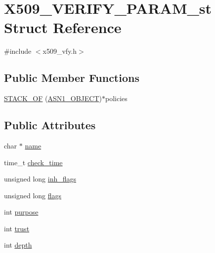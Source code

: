 \hypertarget{struct_x509___v_e_r_i_f_y___p_a_r_a_m__st}{}\section{X509\+\_\+\+V\+E\+R\+I\+F\+Y\+\_\+\+P\+A\+R\+A\+M\+\_\+st Struct Reference}
\label{struct_x509___v_e_r_i_f_y___p_a_r_a_m__st}


{\ttfamily \#include $<$x509\+\_\+vfy.\+h$>$}

\subsection*{Public Member Functions}
\begin{DoxyCompactItemize}
\item 
\hyperlink{struct_x509___v_e_r_i_f_y___p_a_r_a_m__st_a5087643f8379670666afff2ef319f0f2}{S\+T\+A\+C\+K\+\_\+\+OF} (\hyperlink{asn1_8h_ae10c08e4e6b23f67a39b2add932ec48f}{A\+S\+N1\+\_\+\+O\+B\+J\+E\+CT})$\ast$policies
\end{DoxyCompactItemize}
\subsection*{Public Attributes}
\begin{DoxyCompactItemize}
\item 
char $\ast$ \hyperlink{struct_x509___v_e_r_i_f_y___p_a_r_a_m__st_a60084caf30e3bddf4fe9264a76441411}{name}
\item 
time\+\_\+t \hyperlink{struct_x509___v_e_r_i_f_y___p_a_r_a_m__st_a2f5100a1ff11cf55b96ddaf802f434d0}{check\+\_\+time}
\item 
unsigned long \hyperlink{struct_x509___v_e_r_i_f_y___p_a_r_a_m__st_ae194a37f094a45b53ddd8156c5e2bab1}{inh\+\_\+flags}
\item 
unsigned long \hyperlink{struct_x509___v_e_r_i_f_y___p_a_r_a_m__st_a3ef03c3f57b0a90d4182a057fe0c8d27}{flags}
\item 
int \hyperlink{struct_x509___v_e_r_i_f_y___p_a_r_a_m__st_acae8fafa928701889f757951552f5ee9}{purpose}
\item 
int \hyperlink{struct_x509___v_e_r_i_f_y___p_a_r_a_m__st_a7b7d5b079ed79cb2399ad471d1b57415}{trust}
\item 
int \hyperlink{struct_x509___v_e_r_i_f_y___p_a_r_a_m__st_afb5fd48dac56bdbd2e1d9e8e69bfaf23}{depth}
\end{DoxyCompactItemize}


